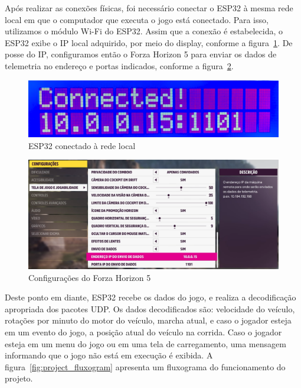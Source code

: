\documentclass[12pt]{article}
\begin{document}
Após realizar as conexões físicas, foi necessário conectar o ESP32 à mesma rede local em que o computador que executa o jogo
está conectado. Para isso, utilizamos o módulo Wi-Fi do ESP32. Assim que a conexão é estabelecida, o ESP32 exibe o IP local
adquirido, por meio do display, conforme a figura~\ref{fig:connected}.
De posse do IP, configuramos então o Forza Horizon 5 para enviar os dados de telemetria no endereço e portas indicados,
conforme a figura~\ref{fig:forza_settings}.

\begin{figure}[ht]
  \centering
  \includegraphics[width=.7\textwidth]{images/connected.png}
  \caption{ESP32 conectado à rede local}
  \label{fig:connected}
\end{figure}

\begin{figure}[ht]
  \centering
  \includegraphics[width=.7\textwidth]{images/forza_settings.png}
  \caption{Configurações do Forza Horizon 5}
  \label{fig:forza_settings}
\end{figure}

Deste ponto em diante, ESP32 recebe os dados do jogo, e realiza a decodificação apropriada dos pacotes UDP.
Os dados decodificados são: velocidade do veículo, rotações por minuto do motor do veículo, marcha atual,
e caso o jogador esteja em um evento do jogo, a posição atual do veículo na corrida.
Caso o jogador esteja em um menu do jogo ou em uma tela de carregamento, uma mensagem informando que o jogo
não está em execução é exibida.
A figura~\ref{fig:project_fluxogram} apresenta um fluxograma do funcionamento do projeto.
\end{document}
